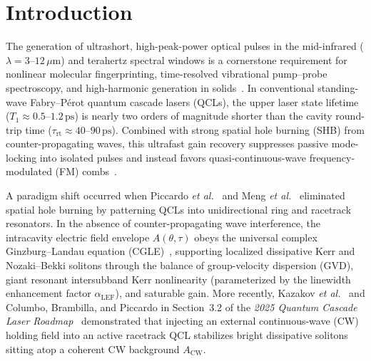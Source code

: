 \documentclass[11pt,letterpaper]{article}
\begin{document}
\section{Introduction}
\label{sec:intro}

The generation of ultrashort, high-peak-power optical pulses in the mid-infrared ($\lambda = 3\text{--}12\,\mu\mathrm{m}$) and terahertz spectral windows is a cornerstone requirement for nonlinear molecular fingerprinting, time-resolved vibrational pump--probe spectroscopy, and high-harmonic generation in solids~\cite{Hugi2012,Faist2016,DhillonRoadmap2025,Vurgaftman2021}. In conventional standing-wave Fabry--P\'erot quantum cascade lasers (QCLs), the upper laser state lifetime ($T_1 \approx 0.5\text{--}1.2\,\mathrm{ps}$) is nearly two orders of magnitude shorter than the cavity round-trip time ($\tau_{\mathrm{rt}} \approx 40\text{--}90\,\mathrm{ps}$). Combined with strong spatial hole burning (SHB) from counter-propagating waves, this ultrafast gain recovery suppresses passive mode-locking into isolated pulses and instead favors quasi-continuous-wave frequency-modulated (FM) combs~\cite{Khurgin2014,Burghoff2020,Vurgaftman2021}.

A paradigm shift occurred when Piccardo \textit{et al.}~\cite{Piccardo2020} and Meng \textit{et al.}~\cite{Meng2022} eliminated spatial hole burning by patterning QCLs into unidirectional ring and racetrack resonators. In the absence of counter-propagating wave interference, the intracavity electric field envelope $A(\theta, \tau)$ obeys the universal complex Ginzburg--Landau equation (CGLE)~\cite{Columbo2021,Opa2024,ColumboRoadmap2025}, supporting localized dissipative Kerr and Nozaki--Bekki solitons through the balance of group-velocity dispersion (GVD), giant resonant intersubband Kerr nonlinearity (parameterized by the linewidth enhancement factor $\alpha_{\mathrm{LEF}}$), and saturable gain. More recently, Kazakov \textit{et al.}~\cite{Kazakov2025} and Columbo, Brambilla, and Piccardo in Section~3.2 of the \textit{2025 Quantum Cascade Laser Roadmap}~\cite{ColumboRoadmap2025} demonstrated that injecting an external continuous-wave (CW) holding field into an active racetrack QCL stabilizes bright dissipative solitons sitting atop a coherent CW background $A_{\mathrm{CW}}$.
\end{document}
